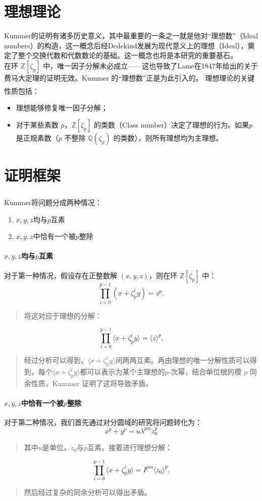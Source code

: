 \documentclass{article}
\newcommand{\upcite}[1]{\textsuperscript{\textsuperscript{\cite{#1}}}}
\begin{document}
\section{理想理论}
\noindent
Kummer的证明有诸多历史意义，其中最重要的一条之一就是他对“理想数”（Ideal numbers）的构造，这一概念后经Dedekind发展为现代意义上的理想（Ideal），奠定了整个交换代数和代数数论的基础。这一概念也将是本研究的重要基石。\\

\noindent
在环 $\mathbb{Z}[\zeta_p]$ 中，唯一因子分解未必成立——这也导致了Lame在1847年给出的关于费马大定理的证明无效。Kummer 的“理想数”正是为此引入的。
理想理论的关键性质包括\upcite{ref1}\upcite{ref2}\upcite{ref3}：
\begin{itemize}
    \item 理想能够修复唯一因子分解；
    \item 对于某些素数 $p$，$\mathbb{Z}[\zeta_p]$ 的类数（Class number）决定了理想的行为。如果$p$是正规素数（$p$ 不整除 $\mathbb{Q}(\zeta_p)$ 的类数），则所有理想均为主理想。
\end{itemize}

\section{证明框架}
\noindent
Kummer将问题分成两种情况\upcite{ref2}\upcite{ref3}\upcite{ref9}：
\begin{enumerate}
\item $x,y,z$均与$p$互素
\item $x,y,z$中恰有一个被$p$整除
\end{enumerate}
\paragraph{$x,y,z$均与$p$互素}
对于第一种情况，假设存在正整数解 $(x,y,z)$，则在环 $\mathbb{Z}[\zeta_p]$ 中：
$$
\prod_{i=0}^{p-1}(x+\zeta_p^iy) = z^p.
$$
\begin{quote}
将这对应于理想的分解：
\end{quote}
$$
\prod_{i=0}^{p-1}\langle x+\zeta_p^iy\rangle = \langle z\rangle^p.
$$
\begin{quote}
经过分析可以得到，$\langle x+\zeta_p^iy\rangle$间两两互素。再由理想的唯一分解性质可以得到，每个$\langle x+\zeta_p^iy\rangle$都可以表示为某个主理想的$p$-次幂，结合单位根的模 $p$ 同余性质，Kummer 证明了这将导致矛盾。
\end{quote}

\paragraph{$x,y,z$中恰有一个被$p$整除} 对于第二种情况，我们首先通过对分圆域的研究将问题转化为：
$$
x^p + y^p = u \lambda^{pm} z_0^{p}
$$
\begin{quote}
其中$u$是单位，$z_0$与$p$互素。接着进行理想分解：
\end{quote}
$$
\prod_{i=0}^{p-1}\langle x+\zeta_p^iy\rangle = I^{pm} \langle z_0\rangle^p.
$$
\begin{quote}
然后经过复杂的同余分析可以得出矛盾。
\end{quote}
\end{document}
